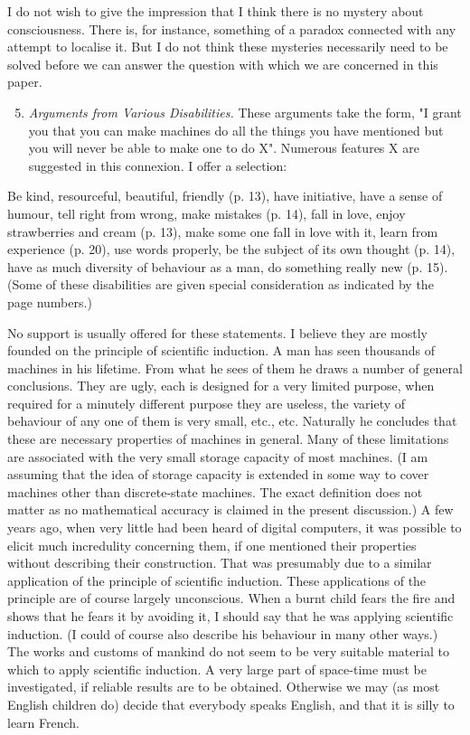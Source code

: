     I do not wish to give the impression that I think there is no mystery about consciousness. There is, for instance, something of a paradox connected with any attempt to localise it. But I do not think these mysteries necessarily need to be solved before we can answer the question with which we are concerned in this paper.
    
    \begin{enumerate}[label=(\arabic*)]
        \setcounter{enumi}{4}
        \item{\textit{Arguments from Various Disabilities.} These arguments take the form, "I grant you that you can make machines do all the things you have mentioned but you will never be able to make one to do X". Numerous features X are suggested in this connexion. I offer a selection:}
    \end{enumerate}

    Be kind, resourceful, beautiful, friendly (p. 13), have initiative, have a sense of humour, tell right from wrong, make mistakes (p. 14), fall in love, enjoy strawberries and cream (p. 13), make some one fall in love with it, learn from experience (p. 20), use words properly, be the subject of its own thought (p. 14), have as much diversity of behaviour as a man, do something really new (p. 15). (Some of these disabilities are given special consideration as indicated by the page numbers.)
    \vspace{\baselineskip}

    No support is usually offered for these statements. I believe they are mostly founded on the principle of scientific induction. A man has seen thousands of machines in his lifetime. From what he sees of them he draws a number of general conclusions. They are ugly, each is designed for a very limited purpose, when required for a minutely different purpose they are useless, the variety of behaviour of any one of them is very small, etc., etc. Naturally he concludes that these are necessary properties of machines in general. Many of these limitations are associated with the very small storage capacity of most machines. (I am assuming that the idea of storage capacity is extended in some way to cover machines other than discrete-state machines. The exact definition does not matter as no mathematical accuracy is claimed in the present discussion.) A few years ago, when very little had been heard of digital computers, it was possible to elicit much incredulity concerning them, if one mentioned their properties without describing their construction. That was presumably due to a similar application of the principle of scientific induction. These applications of the principle are of course largely unconscious. When a burnt child fears the fire and shows that he fears it by avoiding it, I should say that he was applying scientific induction. (I could of course also describe his behaviour in many other ways.) The works and customs of mankind do not seem to be very suitable material to which to apply scientific induction. A very large part of space-time must be investigated, if reliable results are to be obtained. Otherwise we may (as most English children do) decide that everybody speaks English, and that it is silly to learn French.

